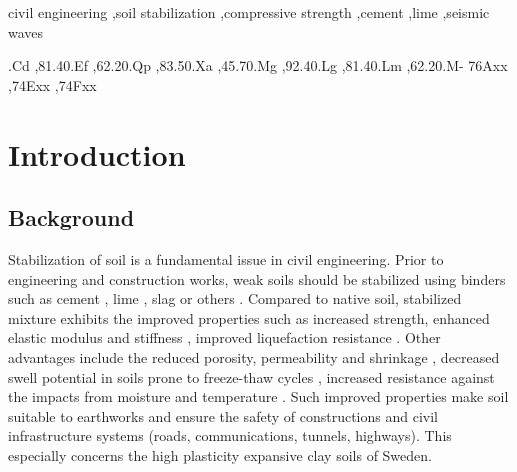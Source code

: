 \documentclass[final,3p,times,onecolumn,authoryear]{elsarticle}
\begin{document}
\begin{frontmatter}
\begin{keyword}

civil engineering \sep soil stabilization \sep compressive strength \sep cement \sep lime \sep seismic waves

.Cd \sep 81.40.Ef \sep 62.20.Qp \sep 83.50.Xa \sep 45.70.Mg \sep 92.40.Lg \sep 81.40.Lm \sep 62.20.M-
\MSC 76Axx \sep 74Exx \sep 74Fxx

\end{keyword}

\end{frontmatter}


\linenumbers
\section{Introduction}

\subsection{Background}

Stabilization of soil is a fundamental issue in civil engineering. Prior to engineering and construction works, weak soils should be stabilized using binders such as cement \citep{Bache,Chenetal2021,LindhLemenkova2022b}, lime \citep{Kichouetal,Chand}, slag \citep{LindhLemenkova2021a} or others \citep{Mirzababaei}. Compared to native soil, stabilized mixture exhibits the improved properties such as increased strength, enhanced elastic modulus and stiffness \citep{Madhyannapuetal2010,SUNDARY2022103299}, improved liquefaction resistance \citep{ITO199433}. Other advantages include the reduced porosity, permeability and shrinkage \citep{TONINIDEARAUJO2023129757,Nagih,Ahnberg2003}, decreased swell potential in soils prone to freeze-thaw cycles \citep{ShihataBaghdadi,BinShafique,Orakoglu}, increased resistance against the impacts from moisture and temperature \citep{Zhangetal2020,Kimetal2012}. Such improved properties make soil suitable to earthworks and ensure the safety of constructions and civil infrastructure systems (roads, communications, tunnels, highways). This especially concerns the high plasticity expansive clay soils of Sweden. 
\end{document}
